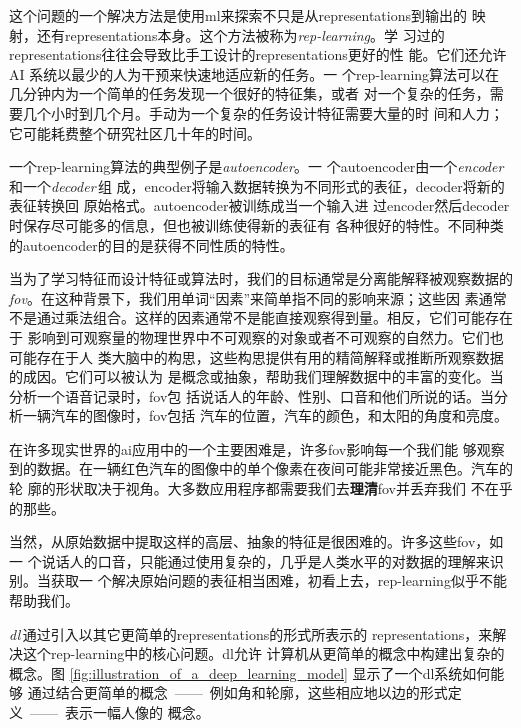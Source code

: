 这个问题的一个解决方法是使用\gls*{ml}来探索不只是从\gls*{representations}到输出的
映射，还有\gls*{representations}本身。这个方法被称为\emph{\gls{rep-learning}}。学
习过的\gls*{representations}往往会导致比手工设计的\gls*{representations}更好的性
能。它们还允许 AI 系统以最少的人为干预来快速地适应新的任务。一
个\gls*{rep-learning}算法可以在几分钟内为一个简单的任务发现一个很好的特征集，或者
对一个复杂的任务，需要几个小时到几个月。手动为一个复杂的任务设计特征需要大量的时
间和人力；它可能耗费整个研究社区几十年的时间。

一个\gls*{rep-learning}算法的典型例子是\emph{\gls{autoencoder}}。一
个\gls*{autoencoder}由一个\emph{\gls{encoder}}\,和一个\emph{\gls{decoder}}\,组
成，\gls*{encoder}将输入数据转换为不同形式的表征，\gls*{decoder}将新的表征转换回
原始格式。\gls*{autoencoder}被训练成当一个输入进
过\gls*{encoder}然后\gls*{decoder}时保存尽可能多的信息，但也被训练使得新的表征有
各种很好的特性。不同种类的\gls*{autoencoder}的目的是获得不同性质的特性。

当为了学习特征而设计特征或算法时，我们的目标通常是分离能解释被观察数据的%
\emph{\gls{fov}}。在这种背景下，我们用单词``因素''来简单指不同的影响来源；这些因
素通常不是通过乘法组合。这样的因素通常不是能直接观察得到量。相反，它们可能存在于
影响到可观察量的物理世界中不可观察的对象或者不可观察的自然力。它们也可能存在于人
类大脑中的构思，这些构思提供有用的精简解释或推断所观察数据的成因。它们可以被认为
是概念或抽象，帮助我们理解数据中的丰富的变化。当分析一个语音记录时，\gls*{fov}包
括说话人的年龄、性别、口音和他们所说的话。当分析一辆汽车的图像时，\gls*{fov}包括
汽车的位置，汽车的颜色，和太阳的角度和亮度。

在许多现实世界的\gls*{ai}应用中的一个主要困难是，许多\gls*{fov}影响每一个我们能
够观察到的数据。在一辆红色汽车的图像中的单个像素在夜间可能非常接近黑色。汽车的轮
廓的形状取决于视角。大多数应用程序都需要我们去\textbf{理清}\gls*{fov}并丢弃我们
不在乎的那些。

当然，从原始数据中提取这样的高层、抽象的特征是很困难的。许多这些\gls*{fov}，如一
个说话人的口音，只能通过使用复杂的，几乎是人类水平的对数据的理解来识别。当获取一
个解决原始问题的表征相当困难，初看上去，\gls*{rep-learning}似乎不能帮助我们。

\emph{\gls{dl}}\,通过引入以其它更简单的\gls*{representations}的形式所表示的%
\gls*{representations}，来解决这个\gls*{rep-learning}中的核心问题。\gls*{dl}允许
计算机从更简单的概念中构建出复杂的概念。图
\ref{fig:illustration_of_a_deep_learning_model} 显示了一个\gls*{dl}系统如何能够
通过结合更简单的概念~——~例如角和轮廓，这些相应地以边的形式定义~——~表示一幅人像的
概念。

